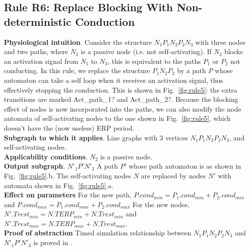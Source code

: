 \subsection{Rule R6: Replace Blocking With Non-deterministic Conduction}
\textbf{Physiological intuition}. 
Consider the structure $N_1 P_1 N_2 P_2 N_3$ with three nodes and two paths, where $N_2$ is a passive node (i.e. not self-activating).
If $N_2$ blocks an activation signal from $N_1$ to $N_3$, this is equivalent to the paths $P_1$ or $P_2$ not conducting.
In this rule, we replace the structure $P_1 N_2 P_2$ by a path $P$ whose automaton can take a self loop when it receives an activation signal, thus effectively stopping the conduction. 
This is shown in Fig.~\ref{fig:rule5}: the extra transitions are marked {\quattrofont Act\_path\_1?} and {\quattrofont Act\_path\_2?}.
Because the blocking effect of nodes is now incorporated into the paths, we can also modify the node automata of self-activating nodes to the one shown in Fig.~\ref{fig:rule5}, which doesn't have the (now useless) ERP period.
\\
\textbf{Subgraph to which it applies}.
Line graphs with 3 vertices $N_1 P_1 N_2 P_2 N_3$, and self-activating nodes.\\
\textbf{Applicability conditions}.
$N_2$ is a passive node.\\
\textbf{Output subgraph}.
$N'_1 P' N'_3$
A path $P'$ whose path automaton is as shown in Fig.~\ref{fig:rule5}.b.
The self-activating nodes $N$ are replaced by nodes $N'$ with automata shown in Fig.~\ref{fig:rule5}.a.\\
\textbf{Effect on parameters}
For the new path, $P.cond_{min}=P_1.cond_{min}+P_2.cond_{min}$ and 
$P.cond_{max}=P_1.cond_{max}+P_2.cond_{max}$
For the new nodes, $N'.Trest_{min}=N.TERP_{min}+N.Trest_{min}$ and 
$N'.Trest_{max}=N.TERP_{max}+N.Trest_{max}$.\\
\textbf{Proof of abstraction} Timed simulation relationship between $N_1 P_1 N_2 P_2 N_3$ and $N'_1 P' N'_3$ is proved in \cite{sttt13}.

